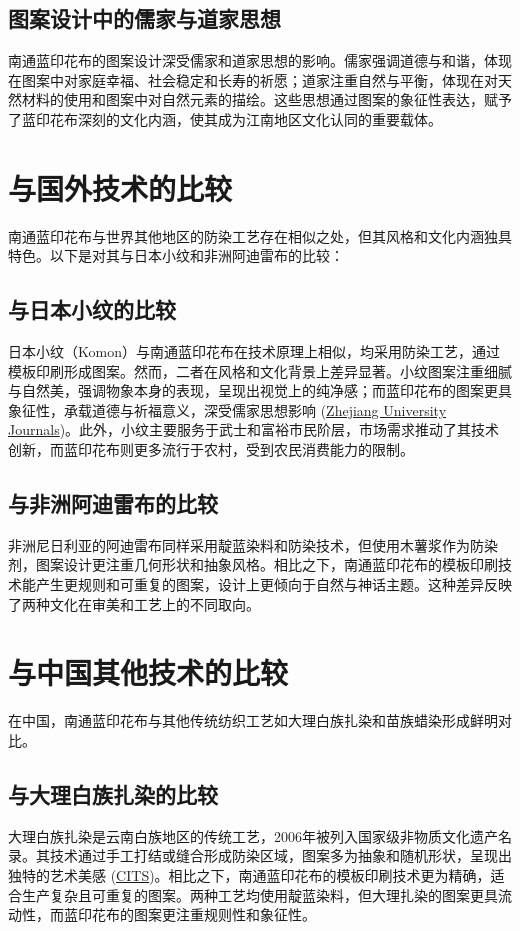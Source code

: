 \documentclass[12pt]{article}
\begin{document}
\subsection{图案设计中的儒家与道家思想}
南通蓝印花布的图案设计深受儒家和道家思想的影响。儒家强调道德与和谐，体现在图案中对家庭幸福、社会稳定和长寿的祈愿；道家注重自然与平衡，体现在对天然材料的使用和图案中对自然元素的描绘。这些思想通过图案的象征性表达，赋予了蓝印花布深刻的文化内涵，使其成为江南地区文化认同的重要载体。

\section{与国外技术的比较}
南通蓝印花布与世界其他地区的防染工艺存在相似之处，但其风格和文化内涵独具特色。以下是对其与日本小纹和非洲阿迪雷布的比较：

\subsection{与日本小纹的比较}
日本小纹（Komon）与南通蓝印花布在技术原理上相似，均采用防染工艺，通过模板印刷形成图案。然而，二者在风格和文化背景上差异显著。小纹图案注重细腻与自然美，强调物象本身的表现，呈现出视觉上的纯净感；而蓝印花布的图案更具象征性，承载道德与祈福意义，深受儒家思想影响 (\href{https://www.zjujournals.com/soc/EN/abstract/abstract133522.shtml}{Zhejiang University Journals})。此外，小纹主要服务于武士和富裕市民阶层，市场需求推动了其技术创新，而蓝印花布则更多流行于农村，受到农民消费能力的限制。

\subsection{与非洲阿迪雷布的比较}
非洲尼日利亚的阿迪雷布同样采用靛蓝染料和防染技术，但使用木薯浆作为防染剂，图案设计更注重几何形状和抽象风格。相比之下，南通蓝印花布的模板印刷技术能产生更规则和可重复的图案，设计上更倾向于自然与神话主题。这种差异反映了两种文化在审美和工艺上的不同取向。

\section{与中国其他技术的比较}
在中国，南通蓝印花布与其他传统纺织工艺如大理白族扎染和苗族蜡染形成鲜明对比。

\subsection{与大理白族扎染的比较}
大理白族扎染是云南白族地区的传统工艺，2006年被列入国家级非物质文化遗产名录。其技术通过手工打结或缝合形成防染区域，图案多为抽象和随机形状，呈现出独特的艺术美感 (\href{http://www.zhangjiajieholiday.com/show-366-2391-1.html}{CITS})。相比之下，南通蓝印花布的模板印刷技术更为精确，适合生产复杂且可重复的图案。两种工艺均使用靛蓝染料，但大理扎染的图案更具流动性，而蓝印花布的图案更注重规则性和象征性。
\end{document}
